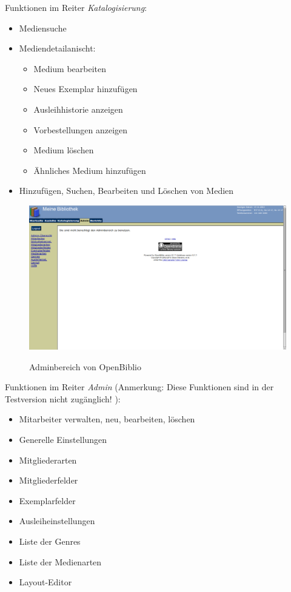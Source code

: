 \documentclass[fontsize=12pt,paper=a4,twoside]{scrartcl}
\begin{document}
Funktionen im Reiter \emph{Katalogisierung}:
\begin{itemize}
	\item Mediensuche
	\item Mediendetailanischt:
	\begin{itemize}
		\item Medium bearbeiten
		\item Neues Exemplar hinzufügen
		\item Ausleihhistorie anzeigen
		\item Vorbestellungen anzeigen
		\item Medium löschen
		\item Ähnliches Medium hinzufügen
	\end{itemize}
	\item Hinzufügen, Suchen, Bearbeiten und Löschen von Medien
\end{itemize}
\newpage
\begin{figure}[h]
\caption{Adminbereich von OpenBiblio}
\includegraphics[width=1\textwidth]{OpenBiblio/reiter_admin.png}
  \label{admin-openbiblio}
\end{figure}
Funktionen im Reiter \emph{Admin} (Anmerkung: Diese Funktionen sind in der Testversion
nicht zugänglich! ):\\
\begin{itemize}
	\item Mitarbeiter verwalten, neu, bearbeiten, löschen
	\item Generelle Einstellungen
	\item Mitgliederarten
	\item Mitgliederfelder
	\item Exemplarfelder
	\item Ausleiheinstellungen
	\item Liste der Genres
	\item Liste der Medienarten
	\item Layout-Editor
\end{itemize}
\end{document}
